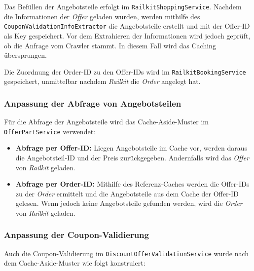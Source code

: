 Das Befüllen der Angebotsteile erfolgt im \texttt{RailkitShoppingService}. Nachdem die Informationen der \textit{Offer} geladen wurden, werden mithilfe des \texttt{CouponValidationInfoExtractor} die Angebotsteile erstellt und mit der Offer-ID als Key gespeichert. Vor dem Extrahieren der Informationen wird jedoch geprüft, ob die Anfrage vom Crawler stammt. In diesem Fall wird das Caching übersprungen.

Die Zuordnung der Order-ID zu den Offer-IDs wird im \texttt{RailkitBookingService} gespeichert, unmittelbar nachdem \textit{Railkit} die \textit{Order} angelegt hat.


\subsubsection{Anpassung der Abfrage von Angebotsteilen}
\label{subsubsec:offerparts}
Für die Abfrage der Angebotsteile wird das Cache-Aside-Muster im \texttt{OfferPartService} verwendet:

\begin{itemize}
    \item \textbf{Abfrage per Offer-ID:} Liegen Angebotsteile im Cache vor, werden daraus die Angebotsteil-ID und der Preis zurückgegeben. Andernfalls wird das \textit{Offer} von \textit{Railkit} geladen.
    \item \textbf{Abfrage per Order-ID:} Mithilfe des Referenz-Caches werden die Offer-IDs zu der \textit{Order} ermittelt und die Angebotsteile aus dem Cache der Offer-ID gelesen. Wenn jedoch keine Angebotsteile gefunden werden, wird die \textit{Order} von \textit{Railkit} geladen.
\end{itemize}


\subsubsection{Anpassung der Coupon-Validierung}
\label{subsubsec:validierung}

Auch die Coupon-Validierung im \texttt{DiscountOfferValidationService} wurde nach dem Cache-Aside-Muster wie folgt konstruiert:

